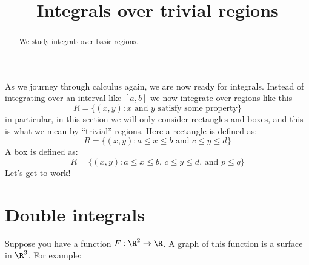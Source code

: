 \documentclass{ximera}
\title[Dig-In:]{Integrals over trivial regions}
\begin{document}
\begin{abstract}
  We study integrals over basic regions.
\end{abstract}
\maketitle

As we journey through calculus again, we are now ready for integrals.
Instead of integrating over an interval like $[a,b]$ we now integrate
over regions like this
\[
R = \{(x,y):\text{$x$ and $y$ satisfy some property}\}
\]
in particular, in this section we will only consider rectangles and
boxes, and this is what we mean by ``trivial'' regions. Here a
rectangle is defined as:
\[
R = \{(x,y):\text{$a\le x\le b$ and $c\le y\le d$}\}
\]
A box is defined as:
\[
R = \{(x,y):\text{$a\le x\le b$, $c\le y\le d$, and $p\le q$}\}
\]
Let's get to work!


\section{Double integrals}

Suppose you have a function $F:\R^2\to\R$. A graph of this function is
a surface in $\R^3$. For example:
\begin{image}
\end{image}
\end{document}
